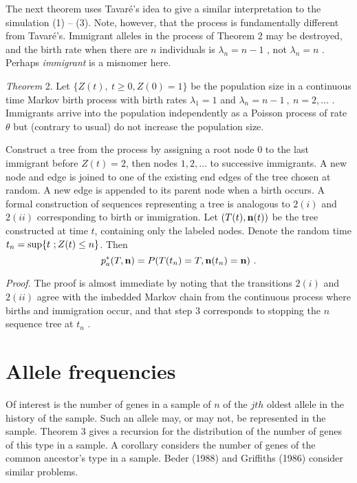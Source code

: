     The next theorem uses Tavar\'{e}'s idea to give a similar
interpretation to the simulation (1) -- (3). Note, however, that the process
is fundamentally different from Tavar\'{e}'s. Immigrant alleles in the
process of Theorem 2 may be destroyed, and the birth rate 
when there are $n$ individuals is $\lambda_n = n - 1$
 , not $\lambda_n = n$ . Perhaps {\em immigrant} is a misnomer here.
\vspace{0.5cm}

    {\em Theorem} 2.  Let $\{Z(t),~t\geq 0,Z(0) = 1\}$ 
be the population size in a
continuous time Markov birth process with birth rates
$\lambda_1 = 1$ and $\lambda_n = n - 1~,~n = 2,\ldots$ . Immigrants arrive
into the population independently as a Poisson process of rate $\theta $
but (contrary to usual) do not increase the population size.

    Construct a tree from the process by assigning a root node $0$ to the last
immigrant before $Z(t) = 2$, then nodes $1,2,\ldots $ to successive
immigrants. A new node and edge 
is joined to one of the existing end edges of the tree
chosen at random. A new edge is appended to its parent node when a birth
occurs. A formal construction of sequences representing a tree is analogous
to $2(i)$ and $2(ii)$ corresponding to birth or immigration. Let 
$(T(t),{\bf n}(t))$ be the tree constructed at time $t$, containing only the
labeled nodes.
Denote the random time $t_n = {\rm sup} \{t~;Z(t) \leq n\}$. Then
$$p_a^*(T,{\bf n}) = P(T(t_n) = T,{\bf n}(t_n) = {\bf n})~.$$

    {\em Proof.} The proof is almost immediate by noting that the transitions
$2(i)$ and $2(ii)$ agree with the imbedded Markov chain from the continuous
process where births and immigration occur, and that step $3$ corresponds to
stopping the $n$ sequence tree at $t_n$ .
\section{Allele frequencies}

    Of interest is the number of genes in a sample of $n$ of the $jth$
oldest allele in the history of the sample.
Such an allele may, or may not, be represented in the sample.
Theorem 3 gives a recursion for the distribution of the number of 
genes of this type in a sample. 
A corollary considers the number of genes of the common ancestor's type in a
sample. Beder (1988) and Griffiths (1986) consider similar problems. 
\vspace{0.5cm}

